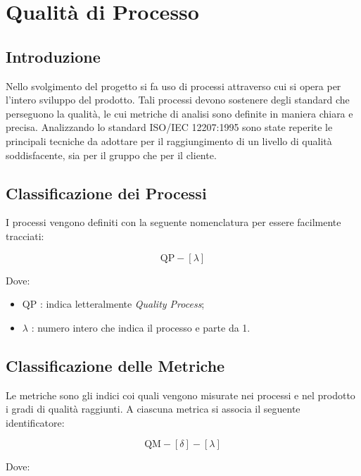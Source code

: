 \section{Qualità di Processo}

\subsection{Introduzione}

Nello svolgimento del progetto si fa uso di processi attraverso cui si opera per l'intero sviluppo del prodotto. Tali processi devono sostenere degli standard che perseguono la qualità, le cui metriche di analisi sono definite in maniera chiara e precisa. Analizzando lo standard ISO/IEC 12207:1995 sono state reperite le principali tecniche da adottare per il raggiungimento di un livello di qualità soddisfacente, sia per il gruppo che per il cliente.



\subsection{Classificazione dei Processi}

I processi vengono definiti con la seguente nomenclatura per essere facilmente tracciati:

\[
		\text{QP}-[\lambda]
\]

Dove: 

\begin{itemize}
	\item QP : indica letteralmente \textit{Quality Process};
	\item \(\lambda\) : numero intero che indica il processo e parte da 1.
\end{itemize}

\subsection{Classificazione delle Metriche}

Le metriche sono gli indici coi quali vengono misurate nei processi e nel prodotto i gradi di qualità raggiunti. A ciascuna metrica si associa il seguente identificatore:

\[
		\text{QM}-[\delta]-[\lambda]
\]

Dove: 


